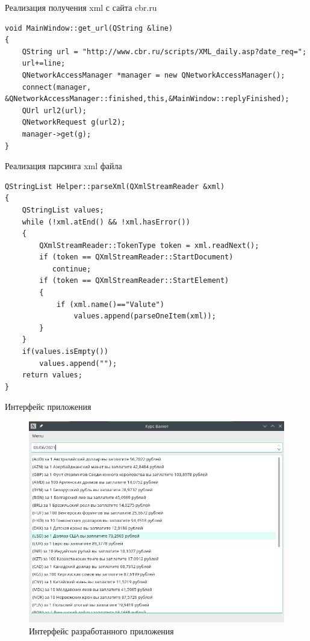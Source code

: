 \documentclass[aspectratio=169,xcolor=dvipsnames]{beamer}
\begin{document}
\begin{frame}[fragile]{Реализация получения xml с сайта cbr.ru}
\begin{lstlisting}
void MainWindow::get_url(QString &line)
{
    QString url = "http://www.cbr.ru/scripts/XML_daily.asp?date_req=";
    url+=line;
    QNetworkAccessManager *manager = new QNetworkAccessManager();
    connect(manager, &QNetworkAccessManager::finished,this,&MainWindow::replyFinished);
    QUrl url2(url);
    QNetworkRequest g(url2);
    manager->get(g);
}
\end{lstlisting}
\end{frame}

\begin{frame}[fragile]{Реализация парсинга xml файла}
\begin{lstlisting}
QStringList Helper::parseXml(QXmlStreamReader &xml)
{
    QStringList values;
    while (!xml.atEnd() && !xml.hasError())
    {
        QXmlStreamReader::TokenType token = xml.readNext();
        if (token == QXmlStreamReader::StartDocument)
           continue;
        if (token == QXmlStreamReader::StartElement)
        {
            if (xml.name()=="Valute")
                values.append(parseOneItem(xml));
        }
    }
    if(values.isEmpty())
        values.append("");
    return values;
}
\end{lstlisting}
\end{frame}


\begin{frame}{Интерфейс приложения}
    \begin{figure}
        \centering
        \includegraphics[scale=0.3]{interface.png}
        \caption{Интерфейс разработанного приложения}
        \label{fig:my_label}
    \end{figure}
\end{frame}
\end{document}
